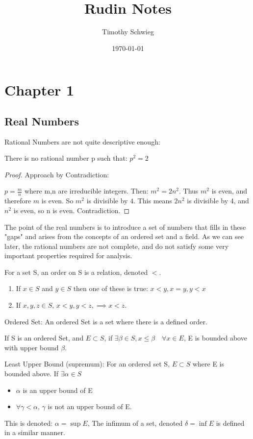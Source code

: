 \documentclass[12pt, letterpaper]{paper}
\author{Timothy Schwieg}
\date{\today}
\title{Rudin Notes}
\begin{document}
\maketitle

\section{Chapter 1}
\label{sec:orge957eb3}


\subsection{Real Numbers}
\label{sec:org8f023da}
Rational Numbers are not quite descriptive enough:

There is no rational number p such that: $p^2 = 2$
\begin{proof}
  Approach by Contradiction:

  $p = \frac{m}{n}$ where m,n are irreducible integers. Then:
  $m^2 = 2 n^2$.  Thus $m^2$ is even, and therefore $m$ is even. So
  $m^2$ is divisible by $4$.  This means $2n^2$ is divisible by 4, and
  $n^2$ is even, so n is even. Contradiction.
\end{proof}

The point of the real numbers is to introduce a set of numbers that
fills in these "gaps" and arises from the concepts of an ordered set
and a field. As we can see later, the rational numbers are not
complete, and do not satisfy some very important properties required
for analysis.

For a set S, an order on S is a relation, denoted $<$.

\begin{enumerate}
\item If $x \in S$ and $y \in S$ then one of these is true:
  $x < y, x = y, y < x$
\item If $x,y,z \in S$, $x < y, y < z, \implies x < z$.
\end{enumerate}


Ordered Set: An ordered Set is a set where there is a defined order.

If S is an ordered Set, and $E \subset S$, if
$\exists \beta \in S, x \leq \beta \quad \forall x \in E$, E is
bounded above with upper bound $\beta$.

\vspace{ .33in }

Least Upper Bound (supremum): For an ordered set S, $E \subset S$
where E is bounded above. If $\exists \alpha \in S$
\begin{itemize}
\item $\alpha$ is an upper bound of E
\item $\forall \gamma < \alpha$, $\gamma$ is not an upper bound of E.
\end{itemize}
This is denoted: $\alpha = \sup{ E }$, The infimum of a set, denoted
$\delta = \inf{ E}$ is defined in a similar manner.
\end{document}
